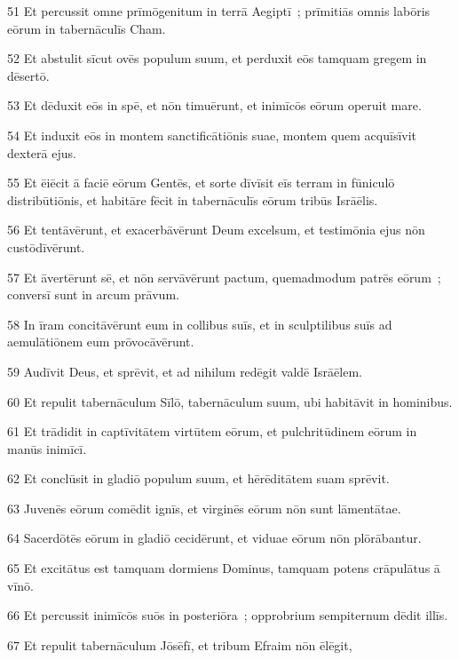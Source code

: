 \psalmVerse
  {\phantom{0}51}
  {Et percussit omne prīmōgenitum in terrā Aegiptī~; prīmitiās omnis labōris eōrum in tabernāculīs Cham.}


\psalmVerse
  {\phantom{0}52}
  {Et abstulit sīcut ovēs populum suum, et perduxit eōs tamquam gregem in dēsertō.}


\psalmVerse
  {\phantom{0}53}
  {Et dēduxit eōs in spē, et nōn timuērunt, et inimīcōs eōrum operuit mare.}


\psalmVerse
  {\phantom{0}54}
  {Et induxit eōs in montem sanctificātiōnis suae, montem quem acquīsīvit dexterā ejus.}


\psalmVerse
  {\phantom{0}55}
  {Et ēiēcit ā faciē eōrum Gentēs, et sorte dīvīsit eīs terram in fūniculō distribūtiōnis, et habitāre fēcit in tabernāculīs eōrum tribūs Isrāēlis.}


\psalmVerse
  {\phantom{0}56}
  {Et tentāvērunt, et exacerbāvērunt Deum excelsum, et testimōnia ejus nōn custōdīvērunt.}


\psalmVerse
  {\phantom{0}57}
  {Et āvertērunt sē, et nōn servāvērunt pactum, quemadmodum patrēs eōrum~; conversī sunt in arcum prāvum.}


\psalmVerse
  {\phantom{0}58}
  {In īram concitāvērunt eum in collibus suīs, et in sculptilibus suīs ad aemulātiōnem eum prōvocāvērunt.}


\psalmVerse
  {\phantom{0}59}
  {Audīvit Deus, et sprēvit, et ad nihilum redēgit valdē Isrāēlem.}


\psalmVerse
  {\phantom{0}60}
  {Et repulit tabernāculum Sīlō, tabernāculum suum, ubi habitāvit in hominibus.}


\psalmVerse
  {\phantom{0}61}
  {Et trādidit in captīvitātem virtūtem eōrum, et pulchritūdinem eōrum in manūs inimīcī.}


\psalmVerse
  {\phantom{0}62}
  {Et conclūsit in gladiō populum suum, et hērēditātem suam sprēvit.}


\psalmVerse
  {\phantom{0}63}
  {Juvenēs eōrum comēdit ignīs, et virginēs eōrum nōn sunt lāmentātae.}


\psalmVerse
  {\phantom{0}64}
  {Sacerdōtēs eōrum in gladiō cecidērunt, et viduae eōrum nōn plōrābantur.}


\psalmVerse
  {\phantom{0}65}
  {Et excitātus est tamquam dormiens Dominus, tamquam potens crāpulātus ā vīnō.}


\psalmVerse
  {\phantom{0}66}
  {Et percussit inimīcōs suōs in posteriōra~; opprobrium sempiternum dēdit illīs.}


\psalmVerse
  {\phantom{0}67}
  {Et repulit tabernāculum Jōsēfī, et tribum Efraim nōn ēlēgit,}



